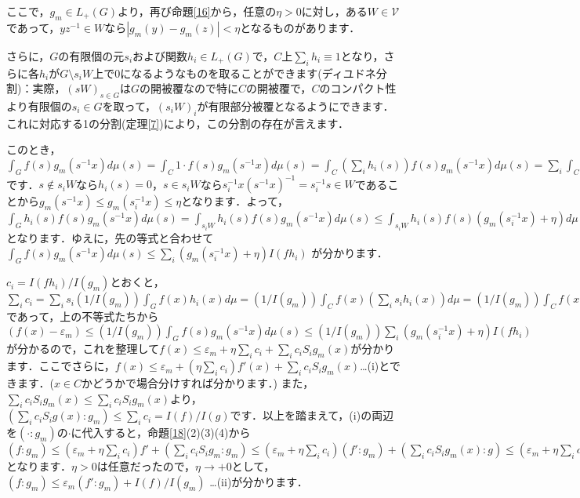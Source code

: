 ここで，$g_{m} \in L_{+}(G)$より，再び命題\ref{16}から，任意の$\eta >0$に対し，ある$W \in \mathscr{V}$であって，$yz^{-1} \in W$なら$|g_{m}(y)-g_{m}(z)|<\eta$となるものがあります．

さらに，$G$の有限個の元$s_{i}$および関数$h_i \in L_{+}(G)$で，$C$上$\sum_{i}h_i \equiv 1$となり，さらに各$h_i$が$G \setminus s_{i}W$上で0になるようなものを取ることができます(ディユドネ分割)：実際，$(sW)_{s \in G}$は$G$の開被覆なので特に$C$の開被覆で，$C$のコンパクト性より有限個の$s_i \in G$を取って，$(s_{i}W)_{i}$が有限部分被覆となるようにできます．これに対応する1の分割(定理\ref{7})により，この分割の存在が言えます．

このとき，$\int_{G}f(s)g_{m}(s^{-1}x)d\mu(s)=\int_{C}1 \cdot f(s)g_{m}(s^{-1}x)d\mu(s)=\int_{C} \left( \sum_{i}h_{i}(s) \right) f(s)g_{m}(s^{-1}x)d\mu(s)=\sum_{i} \int_{C}h_{i}(s)f(s)g_{m}(s^{-1}x)d\mu(s)=\sum_{i} \int_{G}h_{i}(s)f(s)g_{m}(s^{-1}x)d\mu(s)$です．$s \not\in s_{i}W$なら$h_{i}(s)=0$，$s \in s_{i}W$なら$s_{i}^{-1}x(s^{-1}x)^{-1}=s_{i}^{-1}s \in W$であることから$g_{m}(s^{-1}x) \le g_{m}(s_{i}^{-1}x) \le \eta$となります．よって， $\int_{G}h_{i}(s)f(s)g_{m}(s^{-1}x)d\mu(s)=\int_{s_{i}W}h_{i}(s)f(s)g_{m}(s^{-1}x)d\mu(s) \le \int_{s_{i}W}h_{i}(s)f(s)\left( g_{m}(s_{i}^{-1}x) + \eta \right) d\mu(s)=\left( g_{m}(s_{i}^{-1}x) + \eta \right) \int_{G}h_{i}(s)f(s)d\mu(s)=\left( g_{m}(s_{i}^{-1}x) + \eta \right)I(fh_{i})$となります．ゆえに，先の等式と合わせて$\int_{G}f(s)g_{m}(s^{-1}x)d\mu(s) \le \sum_{i}\left( g_{m}(s_{i}^{-1}x) + \eta \right)I(fh_{i})$ が分かります．

$c_i=I(fh_i)/I(g_{m})$とおくと，$\sum_{i}c_{i}=\sum_{i}s_{i}\left( 1/I(g_{m}) \right) \int_{G}f(x)h_{i}(x)d\mu=\left( 1/I(g_{m}) \right) \int_{C}f(x) \left( \sum_{i}s_{i}h_{i}(x) \right) d\mu=\left( 1/I(g_{m}) \right) \int_{C}f(x) d\mu=\left( 1/I(g_{m}) \right) \int_{G}f(x) d\mu=I(f)/I(g_{m})$であって，上の不等式たちから $(f(x)-\varepsilon_{m}) \le \left( 1/I(g_{m}) \right)\int_{G}f(s)g_{m}(s^{-1}x)d\mu(s) \le \left( 1/I(g_{m}) \right) \sum_{i}\left( g_{m}(s_{i}^{-1}x) + \eta \right)I(fh_{i})$が分かるので，これを整理して$f(x) \le \varepsilon_{m} + \eta \sum_{i}c_{i} + \sum_{i}c_{i}S_{i}g_{m}(x)$が分かります．ここでさらに，$f(x) \le \varepsilon_{m} + \left( \eta \sum_{i}c_{i} \right)f'(x) + \sum_{i}c_{i}S_{i}g_{m}(x)$…(i)とできます．($x \in C$かどうかで場合分けすれば分かります．) また，$\sum_{i}c_{i}S_{i}g_{m}(x) \le \sum_{i}c_{i}S_{i}g_{m}(x)$より， $\left( \sum_{i}c_{i}S_{i}g(x) \colon g_{m} \right) \le \sum_{i}c_{i}=I(f)/I(g)$です．以上を踏まえて，(i)の両辺を$\left( \cdot \colon g_{m} \right) $の$\cdot$に代入すると，命題\ref{18}(2)(3)(4)から $\left( f \colon g_{m} \right) \le \left( \varepsilon_{m} + \eta \sum_{i}c_{i} \right)f' + \left( \sum_{i}c_{i}S_{i}g_{m} \colon g_{m} \right) \le \left( \varepsilon_{m} + \eta \sum_{i}c_{i} \right) \left( f' \colon g_{m} \right) + \left( \sum_{i}c_{i}S_{i}g_{m}(x) \colon g \right) \le \left( \varepsilon_{m} + \eta \sum_{i}c_{i} \right) \left( f' \colon g_{m} \right) + I(f)/I(g_{m})$ となります．$\eta>0$は任意だったので，$\eta \to +0$として，$\left( f \colon g_{m} \right) \le \varepsilon_{m} \left( f' \colon g_{m} \right) + I(f)/I(g_{m})$ …(ii)が分かります．


